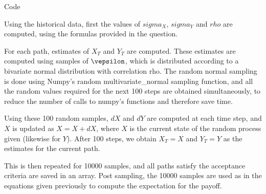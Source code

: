 \documentclass{article}
\begin{document}
\begin{question}
	\begin{qsection}{Code}

		Using the historical data, first the values of $sigma_X$, $sigma_Y$ and $rho$ are computed, using the formulas provided in the question.

		For each path, estimates of $X_T$ and $Y_T$ are computed. These estimates are computed using samples of $\vepsilon$, which is distributed according to a bivariate normal distribution with correlation rho. The random normal sampling is done using Numpy's random multivariate\_normal sampling function, and all the random values required for the next 100 steps are obtained simultaneously, to reduce the number of calls to numpy's functions and therefore save time.

		Using these 100 random samples, $dX$ and $dY$ are computed at each time step, and $X$ is updated as $X = X + dX$, where $X$ is the current state of the random process given (likewise for $Y$). After 100 steps, we obtain $X_T = X$ and $Y_T = Y$ as the estimates for the current path.

		This is then repeated for 10000 samples, and all paths satisfy the acceptance criteria are saved in an array. Post sampling, the 10000 samples are used as in the equations given previously to compute the expectation for the payoff.

	\end{qsection}

\end{question}
\end{document}
